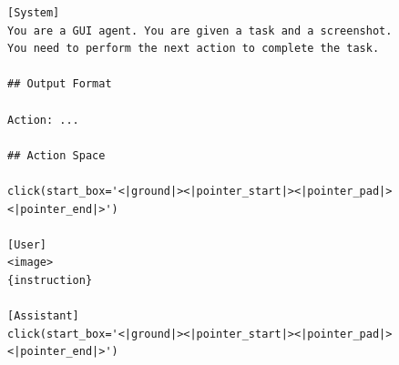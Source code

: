 \begin{figure}[t]
\begin{tcolorbox}[colback=white, width=\linewidth, breakable, enhanced, 
                  title=Prompt for the UI-TARS-1.5 Retrofit Model, fonttitle=\bfseries]

\lstset{
basicstyle=\scriptsize\ttfamily,
    columns=fullflexible,
    breaklines=true,
    breakatwhitespace=false,
    showstringspaces=false,
    lineskip=-1pt
}

\begin{lstlisting}
[System]
You are a GUI agent. You are given a task and a screenshot.
You need to perform the next action to complete the task.

## Output Format

Action: ...

## Action Space

click(start_box='<|ground|><|pointer_start|><|pointer_pad|><|pointer_end|>')

[User]
<image>
{instruction}

[Assistant]
click(start_box='<|ground|><|pointer_start|><|pointer_pad|><|pointer_end|>')
\end{lstlisting}

\end{tcolorbox}
\end{figure}